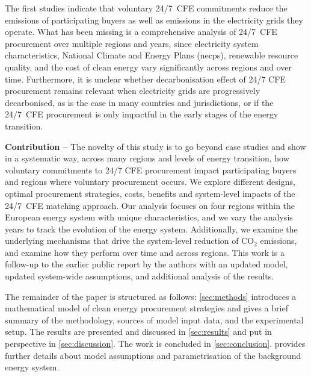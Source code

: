 The first studies indicate that voluntary 24/7~CFE commitments reduce the emissions of participating buyers as well as emissions in the electricity grids they operate.
What has been missing is a comprehensive analysis of 24/7~CFE procurement over multiple regions and years, since electricity system characteristics, National Climate and Energy Plans (\gls{necp}s), renewable resource quality, and the cost of clean energy vary significantly across regions and over time.
Furthermore, it is unclear whether decarbonisation effect of 24/7 CFE procurement remains relevant when electricity grids are progressively decarbonised, as is the case in many countries and jurisdictions, or if the 24/7~CFE procurement is only impactful in the early stages of the energy transition.


\textbf{Contribution --} The novelty of this study is to go beyond case studies and show in a systematic way, across many regions and levels of energy transition, how voluntary commitments to 24/7 CFE procurement impact participating buyers and regions where voluntary procurement occurs.
We explore different designs, optimal procurement strategies, costs, benefits and system-level impacts of the 24/7~CFE matching approach.
Our analysis focuses on four regions within the European energy system with unique characteristics, and we vary the analysis years to track the evolution of the energy system.
Additionally, we examine the underlying mechanisms that drive the system-level reduction of CO$_2$ emissions, and examine how they perform over time and across regions.
This work is a follow-up to the earlier public report by the authors \cite{riepin-zenodo-systemlevel247} with an updated model, updated system-wide assumptions, and additional analysis of the results.


The remainder of the paper is structured as follows: \cref{sec:methods} introduces a mathematical model of clean energy procurement strategies and gives a brief summary of the methodology, sources of model input data, and the experimental setup.
The results are presented and discussed in \cref{sec:results} and put in perspective in \cref{sec:discussion}.
The work is concluded in \cref{sec:conclusion}.
 provides further details about model assumptions and parametrisation of the background energy system.